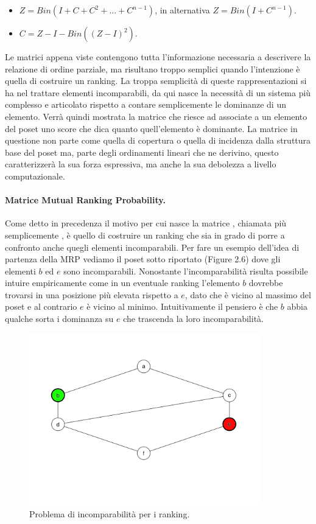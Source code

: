 \documentclass{report}
\begin{document}
\begin{itemize}
    \item $Z=Bin(I+C+C^2+...+C^{n-1})$, in alternativa $Z=Bin(I+C^{n-1})$.
    \item $C=Z-I-Bin((Z-I)^2)$.
\end{itemize}

Le matrici appena viste contengono tutta l’informazione necessaria a descrivere la relazione di ordine parziale, ma risultano troppo semplici quando l'intenzione è quella di costruire un ranking. La troppa semplicità di queste rappresentazioni si ha nel trattare elementi incomparabili, da qui nasce la necessità di un sistema più complesso e articolato rispetto a contare semplicemente le dominanze di un elemento.
Verrà quindi mostrata la matrice che riesce ad associate a un elemento del poset uno score che dica quanto quell'elemento è dominante. La matrice in questione non parte come quella di copertura o quella di incidenza dalla struttura base del poset ma, parte degli ordinamenti lineari che ne derivino, questo caratterizzerà la sua forza espressiva, ma anche la sua debolezza a livello computazionale.

\paragraph{Matrice Mutual Ranking Probability.}
Come detto in precedenza il motivo per cui nasce la matrice , chiamata più semplicemente , è quello di costruire un ranking che sia in grado di porre a confronto anche quegli elementi incomparabili. Per fare un esempio dell'idea di partenza della MRP vediamo il poset sotto riportato (Figure 2.6) dove gli elementi $b$ ed $e$ sono incomparabili. Nonostante l'incomparabilità risulta possibile intuire empiricamente come in un eventuale ranking l'elemento $b$ dovrebbe trovarsi in una posizione più elevata rispetto a $e$, dato che è vicino al massimo del poset e al contrario $e$ è vicino al minimo. Intuitivamente il pensiero è che $b$ abbia qualche sorta i dominanza su $e$ che trascenda la loro incomparabilità. 

\begin{figure}[H]
    \centering
    \includegraphics[width=10cm]{IMAGES/poset_8.5.png}
    \caption{Problema di incomparabilità per i ranking.}
    \label{fig:roc}
\end{figure}
\end{document}
